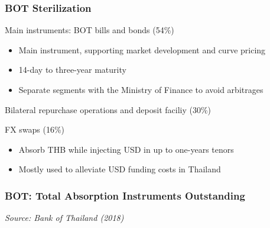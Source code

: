 \documentclass{beamer}
\newenvironment{wideitemize}{\itemize\addtolength{\itemsep}{10pt}}{\enditemize}
\begin{document}
\begin{frame}
  \frametitle{BOT Sterilization}
  \begin{wideitemize}
  \item Main instruments: BOT bills and bonds (54\%)
    \begin{itemize}
    \item Main instrument, supporting market development and curve pricing
    \item 14-day to three-year maturity
    \item Separate segments with the Ministry of Finance to avoid arbitrages
    \end{itemize}
    \item Bilateral repurchase operations and deposit faciliy (30\%)
    \item FX swaps (16\%)
      \begin{itemize}
      \item Absorb THB while injecting USD in up to one-years tenors
      \item Mostly used to alleviate USD funding costs in Thailand
      \end{itemize}
      
  \end{wideitemize}
\end{frame}

\begin{frame}
\frametitle{BOT: Total Absorption Instruments Outstanding}
\medskip
\emph{Source: Bank of Thailand (2018)}
\end{frame}
\end{document}
